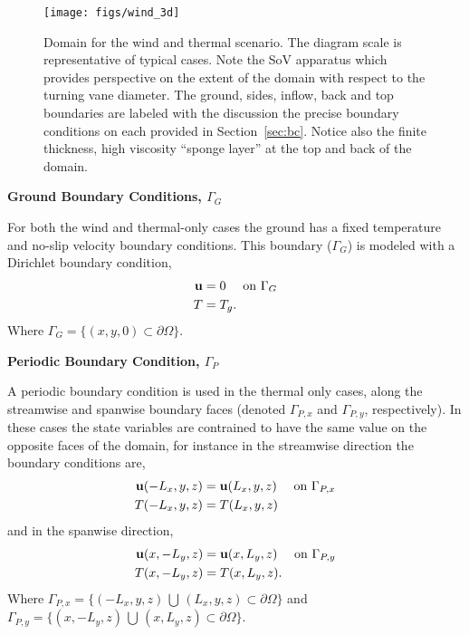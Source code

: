 \begin{figure}[!htb]
  \begin{center}
   \texttt{[image: figs/wind\_3d]}
    \caption{Domain for the wind and thermal scenario. The diagram scale
   is representative of typical cases. Note the SoV apparatus which
   provides perspective on the extent of the domain with respect to the
   turning vane diameter. The ground, sides, inflow, back and top
   boundaries are labeled with the discussion the precise boundary
   conditions on each provided in Section~\ref{sec:bc}. Notice also the
   finite thickness, high viscosity ``sponge layer'' at the top and back
   of the domain.}   
    \label{fig:wind3d}
  \end{center}
\end{figure}

\textbf{Ground Boundary Conditions, $\Gamma_G$} 

For both the wind and thermal-only cases the ground has a fixed
temperature and no-slip velocity boundary conditions. This boundary 
($\Gamma_G$) is modeled with a Dirichlet boundary condition, 
\begin{align}
 {\bf u} &= 0 \quad \text{ on } \Gamma_G \\
 T &= T_g.
\end{align}
Where $\Gamma_G = \{(x,y,0) \subset \partial \Omega \} $. 

%
%
%
\textbf{Periodic Boundary Condition, $\Gamma_P$} 

A periodic boundary condition is used in the thermal only cases, 
along the streamwise and spanwise boundary faces 
(denoted $\Gamma_{P,x}$ and $\Gamma_{P,y}$, respectively). In these
cases the state variables  
are contrained to have the same value on the opposite faces of the domain, 
for instance in the streamwise direction the boundary conditions are, 
\begin{align}
 {\bf u}(-L_x,y,z) &= {\bf u}(L_x,y,z) \quad \text{ on } \Gamma_{P,x} \\
 T(-L_x,y,z) &= T(L_x,y,z)
\end{align}
and in the spanwise direction,
\begin{align}
 {\bf u}(x,-L_y,z) &= {\bf u}(x,L_y,z) \quad \text{ on } \Gamma_{P,y} \\
 T(x,-L_y,z) &= T(x,L_y,z). 
\end{align}
Where $\Gamma_{P,x} = \{(-L_x,y,z) \, \bigcup \, (L_x,y,z) \subset \partial
\Omega \}$  
and $\Gamma_{P,y} = \{(x,-L_y,z) \, \bigcup \, (x,L_y,z) \subset \partial
\Omega \}$. 

